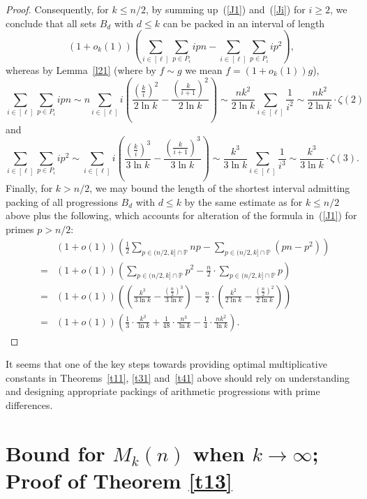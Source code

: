 \documentclass[12pt]{amsart}
\theoremstyle{plain}
\numberwithin{equation}{section}
\begin{document}
\begin{proof}
			
			Consequently, for $k\leqslant n/2$, by summing up~(\ref{J1}) and~(\ref{Ji}) for $i\geqslant 2$, we conclude that all sets $B_d$ with $d\leqslant k$ can be packed in an interval of length
		$$(1+o_k(1))\left(\sum_{i\in [\ell]}\sum_{p\in P_i}ipn -\sum_{i\in [\ell]}\sum_{p\in P_i}ip^2\right),$$ 
		whereas by Lemma~\ref{l21} (where by $f\sim g$ we mean $f=(1+o_k(1))g$),
		$$
		\sum_{i\in [\ell]}\sum_{p\in P_i}ipn 
		\sim n\sum_{i\in [\ell]} i\left(\frac{\left(\frac{k}{i}\right)^2}{2\ln k}-\frac{\left(\frac{k}{i+1}\right)^2}{2\ln k}\right)
		\sim \frac{nk^2}{2\ln k} \sum_{i\in [\ell]}\frac{1}{i^2}
		\sim \frac{nk^2}{2\ln k} \cdot \zeta(2)
		$$
		and
		$$
		\sum_{i\in [\ell]}\sum_{p\in P_i}ip^2 
		\sim \sum_{i\in [\ell]} i\left(\frac{\left(\frac{k}{i}\right)^3}{3\ln k}-\frac{\left(\frac{k}{i+1}\right)^3}{3\ln k}\right)
		\sim \frac{k^3}{3\ln k} \sum_{i\in [\ell]}\frac{1}{i^3}
		\sim \frac{k^3}{3\ln k} \cdot \zeta(3).
		$$
		Finally, for $k>n/2$, we may bound the length of the shortest interval admitting packing of all progressions $B_d$ with $d\leqslant k$ by the same estimate as for $k\leqslant n/2$ above 
		plus the following, which accounts for alteration of the formula in~(\ref{J1}) for primes $p>n/2$: 
		\begin{eqnarray}
			&&(1+o(1))\left(\frac{1}{2}\sum_{p\in(n/2,k]\cap\mathbb{P}}np-\sum_{p\in(n/2,k]\cap\mathbb{P}}(pn-p^2)\right) \nonumber\\
			&=& (1+o(1))\left(\sum_{p\in(n/2,k]\cap\mathbb{P}}p^2-\frac{n}{2}\cdot \sum_{p\in(n/2,k]\cap\mathbb{P}}p\right) \nonumber\\
			&=& (1+o(1))\left(\left(\frac{k^3}{3\ln k}-\frac{\left(\frac{n}{2}\right)^3}{3\ln k}\right)
			-\frac{n}{2}\cdot \left(\frac{k^2}{2\ln k}-\frac{\left(\frac{n}{2}\right)^2}{2\ln k}\right)\right) \nonumber\\
			&=& (1+o(1))\left(\frac{1}{3}\cdot\frac{k^3}{\ln k}
			+\frac{1}{48}\cdot\frac{n^3}{\ln k}
			-\frac{1}{4}\cdot\frac{nk^2}{\ln k}\right). \nonumber
		\end{eqnarray}	
	\end{proof}
	
	It seems that one of the key steps towards providing optimal multiplicative constants in Theorems~\ref{t11}, \ref{t31} and~\ref{t41} above should 
	rely on 
	understanding and designing appropriate packings of arithmetic progressions with prime differences.
	
	
	
\section{Bound for $M_k(n)$ when $k\rightarrow \infty$; Proof of Theorem \ref{t13}}
	
\end{document}
